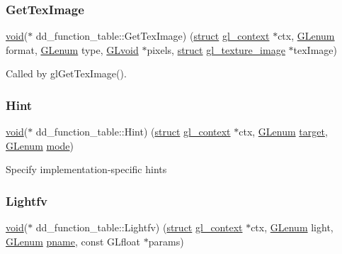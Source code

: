 \subsubsection{\texorpdfstring{Get\+Tex\+Image}{GetTexImage}}
{\footnotesize\ttfamily \hyperlink{interfacevoid}{void}($\ast$ dd\+\_\+function\+\_\+table\+::\+Get\+Tex\+Image) (\hyperlink{interfacestruct}{struct} \hyperlink{structgl__context}{gl\+\_\+context} $\ast$ctx, \hyperlink{interfacevoid}{G\+Lenum} format, \hyperlink{interfacevoid}{G\+Lenum} type, \hyperlink{interfacevoid}{G\+Lvoid} $\ast$pixels, \hyperlink{interfacestruct}{struct} \hyperlink{structgl__texture__image}{gl\+\_\+texture\+\_\+image} $\ast$tex\+Image)}

Called by gl\+Get\+Tex\+Image(). \mbox{\label{structdd__function__table_a3a33772ef04628691bd808904b1c1c0d}} 
\subsubsection{\texorpdfstring{Hint}{Hint}}
{\footnotesize\ttfamily \hyperlink{interfacevoid}{void}($\ast$ dd\+\_\+function\+\_\+table\+::\+Hint) (\hyperlink{interfacestruct}{struct} \hyperlink{structgl__context}{gl\+\_\+context} $\ast$ctx, \hyperlink{interfacevoid}{G\+Lenum} \hyperlink{interfacevoid}{target}, \hyperlink{interfacevoid}{G\+Lenum} \hyperlink{interfacevoid}{mode})}

Specify implementation-\/specific hints \mbox{\label{structdd__function__table_a43b63d95c85f068186d818b1d8cb2b51}} 
\subsubsection{\texorpdfstring{Lightfv}{Lightfv}}
{\footnotesize\ttfamily \hyperlink{interfacevoid}{void}($\ast$ dd\+\_\+function\+\_\+table\+::\+Lightfv) (\hyperlink{interfacestruct}{struct} \hyperlink{structgl__context}{gl\+\_\+context} $\ast$ctx, \hyperlink{interfacevoid}{G\+Lenum} light, \hyperlink{interfacevoid}{G\+Lenum} \hyperlink{interfacevoid}{pname}, const G\+Lfloat $\ast$params)}


